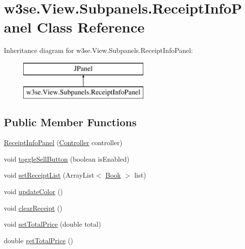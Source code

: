\hypertarget{classw3se_1_1_view_1_1_subpanels_1_1_receipt_info_panel}{\section{w3se.\-View.\-Subpanels.\-Receipt\-Info\-Panel Class Reference}
\label{classw3se_1_1_view_1_1_subpanels_1_1_receipt_info_panel}
}
Inheritance diagram for w3se.\-View.\-Subpanels.\-Receipt\-Info\-Panel\-:\begin{figure}[H]
\begin{center}
\leavevmode
\includegraphics[height=2.000000cm]{classw3se_1_1_view_1_1_subpanels_1_1_receipt_info_panel}
\end{center}
\end{figure}
\subsection*{Public Member Functions}
\begin{DoxyCompactItemize}
\item 
\hyperlink{classw3se_1_1_view_1_1_subpanels_1_1_receipt_info_panel_a791a6d9b86f89fcaa4318087e1887026}{Receipt\-Info\-Panel} (\hyperlink{interfacew3se_1_1_controller_1_1_controller}{Controller} controller)
\item 
void \hyperlink{classw3se_1_1_view_1_1_subpanels_1_1_receipt_info_panel_a0182e005f667d0a2cabd3ab312ba0fcd}{toggle\-Sell\-Button} (boolean is\-Enabled)
\item 
void \hyperlink{classw3se_1_1_view_1_1_subpanels_1_1_receipt_info_panel_a5aa6efa4ba4d88a1d06de549e484580f}{set\-Receipt\-List} (Array\-List$<$ \hyperlink{classw3se_1_1_model_1_1_base_1_1_book}{Book} $>$ list)
\item 
void \hyperlink{classw3se_1_1_view_1_1_subpanels_1_1_receipt_info_panel_ad5a7b3d1d4911cb9e63ef4a07bdda71a}{update\-Color} ()
\item 
void \hyperlink{classw3se_1_1_view_1_1_subpanels_1_1_receipt_info_panel_a976f526f5f1b6850586a5c59fc49b57f}{clear\-Receipt} ()
\item 
void \hyperlink{classw3se_1_1_view_1_1_subpanels_1_1_receipt_info_panel_ad6422dc42fea286745991bf49f62c3d7}{set\-Total\-Price} (double total)
\item 
double \hyperlink{classw3se_1_1_view_1_1_subpanels_1_1_receipt_info_panel_abb8559aa8fd9317938aecae5434851f4}{get\-Total\-Price} ()
\end{DoxyCompactItemize}

